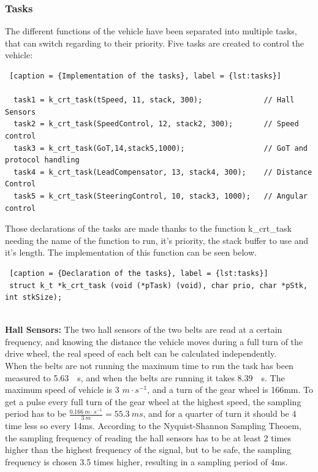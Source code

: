\newpage
\subsubsection{Tasks}
The different functions of the vehicle have been separated into multiple tasks, that can switch regarding to their priority. Five tasks are created to control the vehicle:

\begin{lstlisting} [caption = {Implementation of the tasks}, label = {lst:tasks}]

  task1 = k_crt_task(tSpeed, 11, stack, 300);         	   // Hall Sensors
  task2 = k_crt_task(SpeedControl, 12, stack2, 300); 	   // Speed control
  task3 = k_crt_task(GoT,14,stack5,1000);        		   // GoT and protocol handling
  task4 = k_crt_task(LeadCompensator, 13, stack4, 300);    // Distance Control
  task5 = k_crt_task(SteeringControl, 10, stack3, 1000);   // Angular control

\end{lstlisting}

Those declarations of the tasks are made thanks to the function k\_crt\_task needing the name of the function to run, it's priority, the stack buffer to use and it's length. The implementation of this function can be seen below.


\begin{lstlisting} [caption = {Declaration of the tasks}, label = {lst:tasks}]
 struct k_t *k_crt_task (void (*pTask) (void), char prio, char *pStk, int stkSize);
 
\end{lstlisting}


\textbf{Hall Sensors:}
The two hall sensors of the two belts are read at a certain frequency, and knowing the distance the vehicle moves during a full turn of the drive wheel, the real speed of each belt can be calculated independently.\\
When the belts are not running the maximum time to run the task has been measured to \SI{5.63}{\mu s}, and when the belts are running it takes \SI{8.39}{\mu s}.
The maximum speed of vehicle is 3 $m \cdot s^{-1}$, and a turn of the gear wheel is 166mm. To get a pulse every full turn of the gear wheel at the highest speed, the sampling period has to be $\frac{\SI{0.166}{m\cdot s^{-1}}}{\SI{3}{m}}={\SI{55.3}{ms}}$, and for a quarter of turn it should be 4 time less so every 14ms. According to the Nyquist-Shannon Sampling Theoem, the sampling frequency of reading the hall sensors has to be at least 2 times higher than the highest frequency of the signal, but to be safe, the sampling frequency is chosen \SI{3.5}{} times higher, resulting in a sampling period of 4ms.

